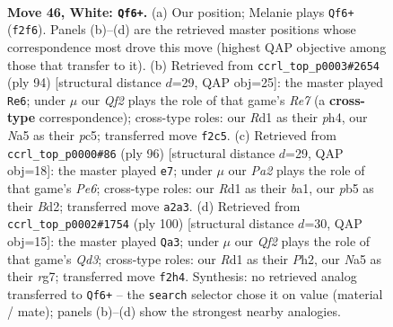 \documentclass[11pt]{article}
\begin{document}
\clearpage

\begin{figure}[p]\centering
\begin{subfigure}{0.46\textwidth}\centering
\resizebox{\linewidth}{!}{%
\newchessgame
\chessboard[
  setfen={6rk/7p/7P/Np6/6P1/8/PP3Q1K/3R4 w - - 1 46},
  showmover=false,
  pgfstyle=straightmove, color=movearrow, markmove={f2-f6}
]}
\caption{}
\end{subfigure}\hfill
\begin{subfigure}{0.46\textwidth}\centering
\resizebox{\linewidth}{!}{%
\newchessgame
\chessboard[
  setfen={5rk1/4R3/6p1/p1p3P1/5P1p/1P2K3/1P6/8 w - - 3 48},
  showmover=false,
  pgfstyle=straightmove, color=movearrow, markmove={e7-e6}
]}
\caption{}
\end{subfigure}
\\[4pt]
\begin{subfigure}{0.46\textwidth}\centering
\resizebox{\linewidth}{!}{%
\newchessgame
\chessboard[
  setfen={5rk1/8/3NP3/7p/6p1/3p2P1/3B1P2/b5K1 w - - 0 49},
  showmover=false,
  pgfstyle=straightmove, color=movearrow, markmove={e6-e7}
]}
\caption{}
\end{subfigure}\hfill
\begin{subfigure}{0.46\textwidth}\centering
\resizebox{\linewidth}{!}{%
\newchessgame
\chessboard[
  setfen={8/6r1/4kp2/4r3/2K5/3QP3/6PP/8 w - - 9 51},
  showmover=false,
  pgfstyle=straightmove, color=movearrow, markmove={d3-a3}
]}
\caption{}
\end{subfigure}
\caption{\textbf{Move 46, White: \texttt{Qf6+}.} (a) Our position; Melanie plays \texttt{Qf6+} (\texttt{f2f6}). Panels (b)--(d) are the retrieved master positions whose correspondence most drove this move (highest QAP objective among those that transfer to it). (b) Retrieved from \texttt{ccrl\_top\_p0003\#2654} (ply 94) [structural distance $d$=29, QAP obj=25]: the master played \texttt{Re6}; under $\mu$ our \emph{Qf2} plays the role of that game's \emph{Re7} (a \textbf{cross-type} correspondence); cross-type roles: our \emph{R}d1 as their \emph{p}h4, our \emph{N}a5 as their \emph{p}c5; transferred move \texttt{f2c5}. (c) Retrieved from \texttt{ccrl\_top\_p0000\#86} (ply 96) [structural distance $d$=29, QAP obj=18]: the master played \texttt{e7}; under $\mu$ our \emph{Pa2} plays the role of that game's \emph{Pe6}; cross-type roles: our \emph{R}d1 as their \emph{b}a1, our \emph{p}b5 as their \emph{B}d2; transferred move \texttt{a2a3}. (d) Retrieved from \texttt{ccrl\_top\_p0002\#1754} (ply 100) [structural distance $d$=30, QAP obj=15]: the master played \texttt{Qa3}; under $\mu$ our \emph{Qf2} plays the role of that game's \emph{Qd3}; cross-type roles: our \emph{R}d1 as their \emph{P}h2, our \emph{N}a5 as their \emph{r}g7; transferred move \texttt{f2h4}. Synthesis: no retrieved analog transferred to \texttt{Qf6+} -- the \texttt{search} selector chose it on value (material / mate); panels (b)--(d) show the strongest nearby analogies.}
\label{fig:thought-m90}
\end{figure}
\end{document}
